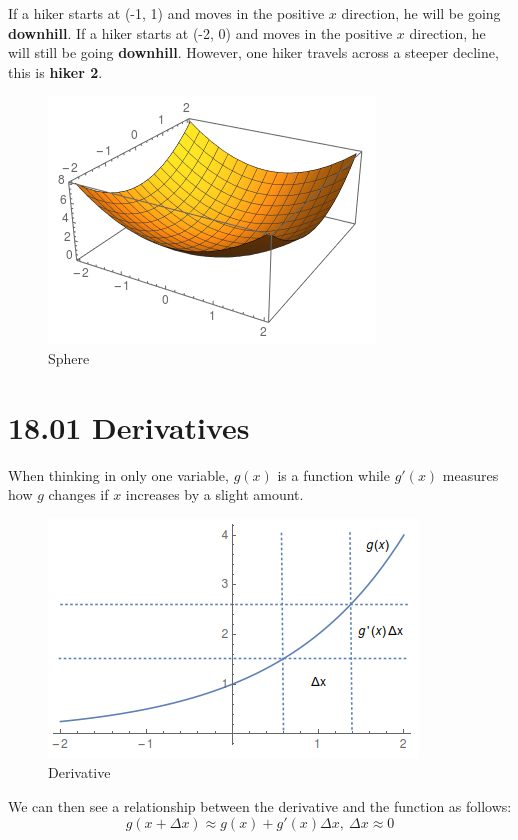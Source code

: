 \documentclass{article}
\begin{document}
If a hiker starts at (-1, 1) and moves in the positive $x$ direction, he will be
going \textbf{downhill}. If a hiker starts at (-2, 0) and moves in the positive
$x$ direction, he will still be going \textbf{downhill}. However, one hiker
travels across a steeper decline, this is \textbf{hiker 2}.

\begin{figure}[H]
  \centering
  \includegraphics[scale=0.75]{"Sphere"}
  \caption{Sphere}
\end{figure}

\section{ 18.01 Derivatives }

When thinking in only one variable, $ g(x) $ is a function while $ g'(x) $
measures how $g$ changes if $x$ increases by a slight amount.

\begin{figure}[H]
  \centering
  \includegraphics[scale=0.65]{"Derivative"}
  \caption{Derivative}
\end{figure}

We can then see a relationship between the derivative and the function as
follows:
$$ g(x + \Delta x) \approx g(x) + g'(x) \Delta x,\ \Delta x \approx 0 $$
\end{document}
